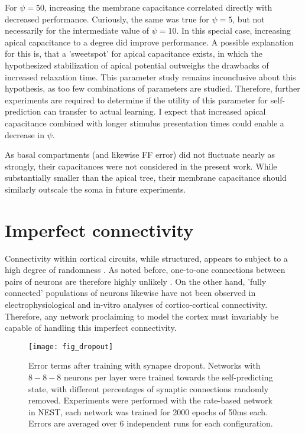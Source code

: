 For $\psi=50$, increasing the membrane capacitance correlated directly with decreased performance. Curiously, the same
was true for $\psi=5$, but not necessarily for the intermediate value of $\psi=10$. In this special case, increasing
apical capacitance to a degree did improve performance. A possible explanation for this is, that a 'sweetspot' for
apical capacitance exists, in which the hypothesized stabilization of apical potential outweighs the drawbacks of
increased relaxation time. This parameter study remains inconclusive about this hypothesis, as too few combinations of
parameters are studied. Therefore, further experiments are required to determine if the utility of this parameter for
self-prediction can transfer to actual learning. I expect that increased apical capacitance combined with longer
stimulus presentation times could enable a decrease in $\psi$. 


As basal compartments (and likewise FF error) did not fluctuate nearly as strongly, their capacitances were not
considered in the present work. While substantially smaller than the apical tree, their membrane capacitance should
similarly outscale the soma in future experiments.


\section{Imperfect connectivity}

Connectivity within cortical circuits, while structured, appears to subject to a high degree of randomness
\citep{potjans2014cell}. As noted before, one-to-one connections between pairs of neurons are therefore highly unlikely
\citep{whittington2019theories}. On the other hand, 'fully connected' populations of neurons likewise have not been
observed in electrophysiological \citep{thomson2002synaptic} and in-vitro \citep{binzegger2004quantitative} analyses of
cortico-cortical connectivity. Therefore, any network proclaiming to model the cortex must invariably be capable of
handling this imperfect connectivity.

\begin{figure}[h]
    \centering
    \texttt{[image: fig\_dropout]}
    \caption[Error terms after training with synapse dropout]{Error terms after training with synapse dropout. Networks
        with $8-8-8$ neurons per layer were trained towards the self-predicting state, with different percentages of
        synaptic connections randomly removed. Experiments were performed with the rate-based network in NEST, each
        network was trained for 2000 epochs of 50ms each. Errors are averaged over 6 independent runs for each
        configuration.}
    \label{fig-dropout}
\end{figure}

